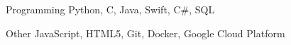 


\begin{cvskills}


\cvskill
{Programming} %
{Python, C, Java, Swift, C\#, SQL} %


\cvskill
{Other} %
{JavaScript, HTML5, Git, Docker, Google Cloud Platform} %



\end{cvskills}
